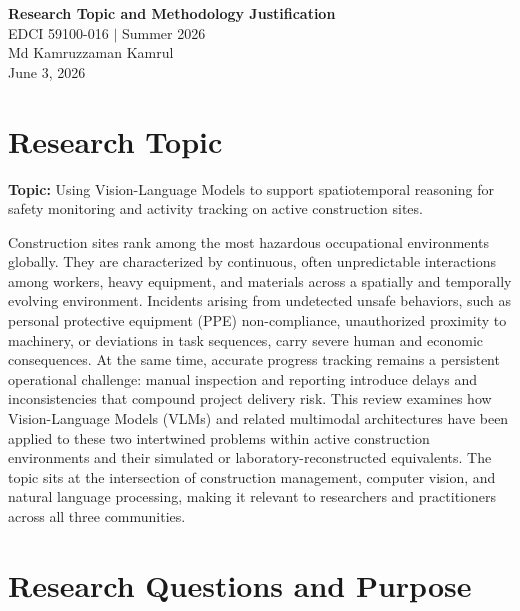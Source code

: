 \documentclass[11pt, letterpaper]{article}
\begin{document}

\begin{center}
  {\Large\bfseries Research Topic and Methodology Justification}\\[0.75em]
  {\normalsize EDCI 59100-016 $|$ Summer 2026}\\[0.25em]
  {\normalsize Md Kamruzzaman Kamrul}\\[0.25em]
  {\normalsize June 3, 2026}
\end{center}

\bigskip
\doublespacing

\section{Research Topic}

\noindent\textbf{Topic:} Using Vision-Language Models to support spatiotemporal
reasoning for safety monitoring and activity tracking on active construction sites.

Construction sites rank among the most hazardous occupational environments
globally. They are characterized by continuous, often unpredictable interactions
among workers, heavy equipment, and materials across a spatially and temporally
evolving environment. Incidents arising from undetected unsafe behaviors, such
as personal protective equipment (PPE) non-compliance, unauthorized proximity
to machinery, or deviations in task sequences, carry severe human and economic
consequences. At the same time, accurate progress tracking remains a persistent
operational challenge: manual inspection and reporting introduce delays and
inconsistencies that compound project delivery risk. This review examines how
Vision-Language Models (VLMs) and related multimodal architectures have been
applied to these two intertwined problems within active construction environments
and their simulated or laboratory-reconstructed equivalents. The topic sits at
the intersection of construction management, computer vision, and natural
language processing, making it relevant to researchers and practitioners across
all three communities.

\section{Research Questions and Purpose}
\end{document}
